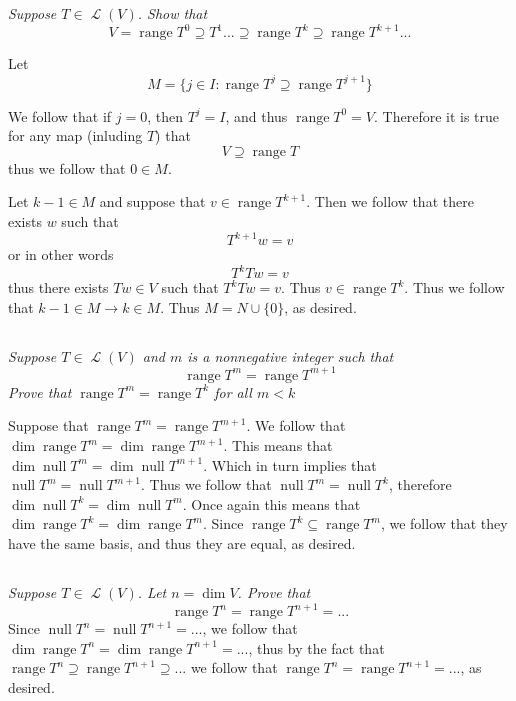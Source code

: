 \documentclass[11pt,oneside,titlepage]{book}
\DeclareMathOperator \map {\mathcal {L}}
\DeclareMathOperator \ns {null}
\DeclareMathOperator \range {range}
\begin{document}
\subsection{}

\textit{Suppose $T \in \map(V)$. Show that
  $$V = \range T^0 \supseteq T^1 ... \supseteq \range T^k \supseteq \range T^{k + 1} ...$$}

Let
$$M = \{j \in I: \range T^j \supseteq \range T^{j + 1}\}$$

We follow that if $j = 0$, then $T^j = I$, and thus $\range T^0 = V$. Therefore
it is true for any map (inluding $T$) that
$$V \supseteq \range T$$
thus we follow that
$0 \in M$.

Let $k - 1 \in M$ and  suppose that $v \in \range T^{k + 1}$. Then we follow that there exists $w$
such that
$$T^{k + 1} w = v$$
or in other words
$$T^{k} T w = v$$
thus there exists $Tw \in V$ such that $T^k Tw = v$. Thus $v \in \range T^k$. Thus we
follow that $k - 1 \in M \to k \in M$. Thus $M = N \cup \{0\}$, as desired.

\subsection{}

\textit{Suppose $T \in \map(V)$ and $m$ is a nonnegative integer such that 
$$\range T^m = \range T^{m + 1}$$
Prove that $\range T^m = \range T^k$ for all $m < k$}

Suppose that $\range T^m = \range T^{m + 1}$. We follow that
$\dim \range T^m = \dim \range T^{m + 1}$. This means that $\dim \ns T^m = \dim \ns T^{m + 1}$.
Which in turn implies that $\ns T^m = \ns T^{m + 1}$. Thus we follow that
$\ns T^m = \ns T^k$, therefore $\dim \ns T^k = \dim \ns T^m$. Once again this means that
$\dim \range T^k = \dim \range T^m$. Since $\range T^k \subseteq \range T^m$, we follow that
they have the same basis, and thus they are equal, as desired.

\subsection{}

\textit{Suppose $T \in \map(V)$. Let $n = \dim V$. Prove that
  $$\range T^n = \range T^{n + 1} = ...  $$
}
Since $\ns T^n = \ns T^{n + 1} = ...  $, we follow that
$\dim \range T^n = \dim \range T^{n + 1} = ...$, thus by the fact that
$ \range T^n \supseteq \range T^{n + 1} \supseteq ...$ we follow that
$\range T^n = \range T^{n + 1} = ...$, as desired.
\end{document}
